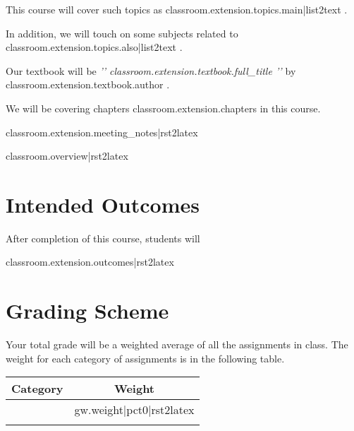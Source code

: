 \documentclass{article}
\begin{document}
{%
This course will cover such topics as {{ classroom.extension.topics.main|list2text }}.
{%
In addition, we will touch on some subjects related to {{ classroom.extension.topics.also|list2text }}.
{%
{%

{%
Our textbook will be \emph{{ '{' }}{{ classroom.extension.textbook.full_title }}{{ '}' }} by {{ classroom.extension.textbook.author }}.
{%
We will be covering chapters {{ classroom.extension.chapters }} in this course.
{%
{%

{{ classroom.extension.meeting_notes|rst2latex }}

{{ classroom.overview|rst2latex }}

{%

\section{Intended Outcomes}

After completion of this course, students will

{{ classroom.extension.outcomes|rst2latex }}

{%

{%

\section{Grading Scheme}

Your total grade will be a weighted average of all the assignments in class. The weight for each category of assignments is in the following table.

\begin{center}

\renewcommand{\arraystretch}{1.5}
\renewcommand{\tabcolsep}{0.2cm}

\begin{tabular}{lc}
\hline
\textbf{Category} & \textbf{Weight} \\
\hline
{%
{{ gw.category }} & {{ gw.weight|pct0|rst2latex }} \\
{%
\hline
\end{tabular}

\end{center}

}}}}}}}}}}}
\end{document}
